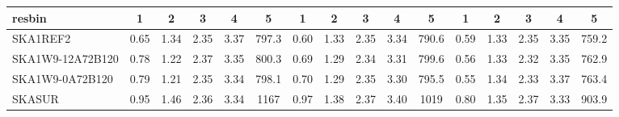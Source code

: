 \begin{table}[!htp]
{{\begin{tabular}{|lccccc||ccccc||ccccc|}
 resbin  &1 & 2 & 3 & 4 & 5 & 1 & 2 & 3 & 4 & 5 & 1 & 2 & 3 & 4 & 5 \tabularnewline \hline
SKA1REF2 & 0.65 \cellcolor{blue!18.00} & 1.34 \cellcolor{red!39.46} & 2.35 \cellcolor{green!18.00} & 3.37 \cellcolor{orange!60.00} & 797.3 \cellcolor{purple!18.00} & 0.60 \cellcolor{blue!18.00} & 1.33 \cellcolor{red!36.08} & 2.35 \cellcolor{green!35.14} & 3.34 \cellcolor{orange!34.60} & 790.6 \cellcolor{purple!18.00} & 0.59 \cellcolor{blue!23.98} & 1.33 \cellcolor{red!18.00} & 2.35 \cellcolor{green!44.28} & 3.35 \cellcolor{orange!35.66} & 759.2 \cellcolor{purple!18.00}\\ \hline 
SKA1W9-12A72B120 & 0.78 \cellcolor{blue!36.72} & 1.22 \cellcolor{red!20.19} & 2.37 \cellcolor{green!60.00} & 3.35 \cellcolor{orange!33.42} & 800.3 \cellcolor{purple!18.34} & 0.69 \cellcolor{blue!28.81} & 1.29 \cellcolor{red!18.83} & 2.34 \cellcolor{green!18.00} & 3.31 \cellcolor{orange!21.49} & 799.6 \cellcolor{purple!19.66} & 0.56 \cellcolor{blue!18.64} & 1.33 \cellcolor{red!18.29} & 2.32 \cellcolor{green!18.00} & 3.35 \cellcolor{orange!33.75} & 762.9 \cellcolor{purple!19.09}\\ \hline 
SKA1W9-0A72B120 & 0.79 \cellcolor{blue!37.29} & 1.21 \cellcolor{red!18.00} & 2.35 \cellcolor{green!26.67} & 3.34 \cellcolor{orange!18.00} & 798.1 \cellcolor{purple!18.09} & 0.70 \cellcolor{blue!28.94} & 1.29 \cellcolor{red!18.00} & 2.35 \cellcolor{green!32.72} & 3.30 \cellcolor{orange!18.00} & 795.5 \cellcolor{purple!18.91} & 0.55 \cellcolor{blue!18.00} & 1.34 \cellcolor{red!36.70} & 2.33 \cellcolor{green!30.31} & 3.37 \cellcolor{orange!60.00} & 763.4 \cellcolor{purple!19.21}\\ \hline 
SKASUR & 0.95 \cellcolor{blue!60.00} & 1.46 \cellcolor{red!60.00} & 2.36 \cellcolor{green!44.78} & 3.34 \cellcolor{orange!19.51} & 1167 \cellcolor{purple!60.00} & 0.97 \cellcolor{blue!60.00} & 1.38 \cellcolor{red!60.00} & 2.37 \cellcolor{green!60.00} & 3.40 \cellcolor{orange!60.00} & 1019 \cellcolor{purple!60.00} & 0.80 \cellcolor{blue!60.00} & 1.35 \cellcolor{red!60.00} & 2.37 \cellcolor{green!60.00} & 3.33 \cellcolor{orange!18.00} & 903.9 \cellcolor{purple!60.00}\tabularnewline \hline 
\end{tabular}}\hfil 
{}}
\end{table}
